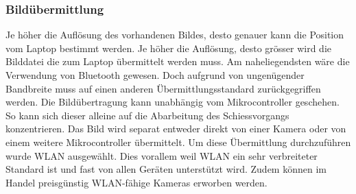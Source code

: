 \subsubsection{Bildübermittlung}
Je höher die Auflösung des vorhandenen Bildes, desto genauer kann die Position vom Laptop bestimmt werden. Je höher die Auflösung, desto grösser wird die Bilddatei die zum Laptop übermittelt werden muss. Am naheliegendsten wäre die Verwendung von Bluetooth gewesen. Doch aufgrund von ungenügender Bandbreite muss auf einen anderen Übermittlungsstandard zurückgegriffen werden. Die Bildübertragung kann unabhängig vom Mikrocontroller geschehen. So kann sich dieser alleine auf die Abarbeitung des Schiessvorgangs konzentrieren. Das Bild wird separat entweder direkt von einer Kamera oder von einem weitere Mikrocontroller übermittelt. Um diese Übermittlung durchzuführen wurde WLAN ausgewählt. Dies vorallem weil WLAN ein sehr verbreiteter Standard ist und fast von allen Geräten unterstützt wird. Zudem können im Handel preisgünstig WLAN-fähige Kameras erworben werden.
